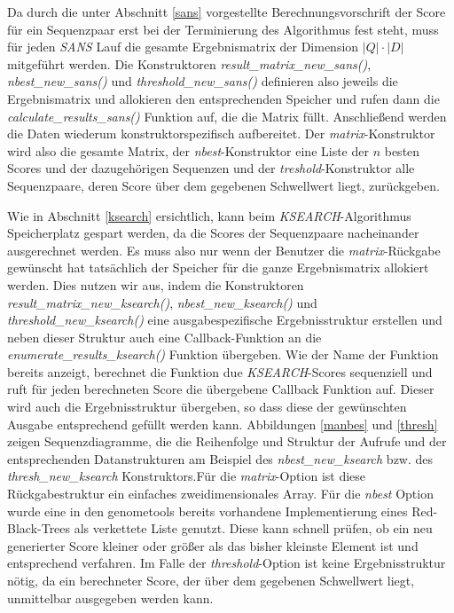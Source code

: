 \documentclass{article}
\begin{document}
Da durch die unter Abschnitt \ref{sans} vorgestellte Berechnungsvorschrift der
Score für ein Sequenzpaar erst bei der Terminierung des Algorithmus
fest steht, muss für jeden \emph{SANS} Lauf die gesamte Ergebnismatrix der Dimension $|Q|\cdot|D|$ mitgeführt werden. Die Konstruktoren 
\emph{result\_matrix\_new\_sans()}, \emph{nbest\_new\_sans()} und  \emph{threshold\_new\_sans()} definieren also jeweils die Ergebnismatrix und allokieren
den entsprechenden Speicher und rufen dann die \emph{calculate\_results\_sans()} Funktion auf, die die Matrix füllt. Anschließend werden die Daten 
wiederum konstruktorspezifisch aufbereitet. Der \emph{matrix}-Konstruktor wird also die gesamte Matrix, der \emph{nbest}-Konstruktor eine
Liste der $n$ besten Scores und der dazugehörigen Sequenzen und der \emph{treshold}-Konstruktor alle Sequenzpaare, deren Score über dem gegebenen
Schwellwert liegt, zurückgeben.

Wie in Abschnitt \ref{ksearch} ersichtlich, kann beim \emph{KSEARCH}-Algorithmus Speicherplatz gespart werden, da die Scores der Sequenzpaare
nacheinander ausgerechnet werden. Es muss also nur wenn der Benutzer die \emph{matrix}-Rückgabe gewünscht hat tatsächlich der Speicher für die
ganze Ergebnismatrix allokiert werden. Dies nutzen wir aus, indem die Konstruktoren \emph{result\_matrix\_new\_ksearch()}, \emph{nbest\_new\_ksearch()} 
und  \emph{threshold\_new\_ksearch()} eine ausgabespezifische Ergebnisstruktur erstellen und neben dieser Struktur auch eine Callback-Funktion an 
die \emph{enumerate\_results\_ksearch()} Funktion übergeben. Wie der Name der Funktion bereits anzeigt, berechnet die Funktion due \emph{KSEARCH}-Scores
sequenziell und ruft für jeden berechneten Score die übergebene Callback Funktion auf. Dieser wird auch die Ergebnisstruktur übergeben, so dass diese
der gewünschten Ausgabe entsprechend gefüllt werden kann. Abbildungen
\ref{manbes} und \ref{thresh} zeigen Sequenzdiagramme, die die
Reihenfolge und Struktur der Aufrufe und der entsprechenden Datanstrukturen am
Beispiel des \emph{nbest\_new\_ksearch} bzw. des \emph{thresh\_new\_ksearch} Konstruktors.Für die \emph{matrix}-Option ist diese Rückgabestruktur ein einfaches zweidimensionales Array. Für die \emph{nbest} Option wurde eine in den genometools
bereits vorhandene Implementierung eines Red-Black-Trees als verkettete Liste genutzt. Diese kann schnell prüfen, ob ein neu generierter Score kleiner oder
größer als das bisher kleinste Element ist und entsprechend verfahren. Im Falle der \emph{threshold}-Option ist keine Ergebnisstruktur nötig,
da ein berechneter Score, der über dem gegebenen Schwellwert liegt, unmittelbar ausgegeben werden kann.
\end{document}
